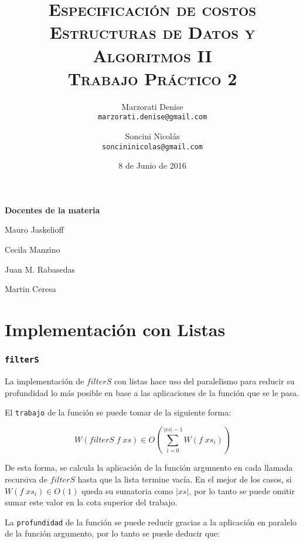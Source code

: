 \documentclass[a4paper,10pt]{article}
\author{
    Marzorati Denise \\
    \texttt{marzorati.denise@gmail.com}
    \and Soncini Nicolás \\
    \texttt{soncininicolas@gmail.com}
}
\date{
    8 de Junio de 2016
}
\title{
    \Huge \textsc{Especificación de costos} \\
    \large \textsc{Estructuras de Datos y Algoritmos II} \\
    \textsc{Trabajo Práctico 2}
}
\begin{document}
\bigskip
\bigskip
\bigskip

\maketitle

\thispagestyle{empty}

\begin{center}
\large \bf Docentes de la materia
\end{center}

\begin{center}
Mauro Jaskelioff

Cecila Manzino

Juan M. Rabasedas

Martin Ceresa
\end{center}

\newpage{}


\part*{Implementación con Listas}


\section*{\texttt{filterS}}

    La implementación de $filterS$ con listas hace uso del paralelismo para
reducir su profundidad lo más posible en base a las aplicaciones de la función 
que se le pasa.

    El \texttt{trabajo} de la función se puede tomar de la siguiente forma:

\begin{equation*}
    W \left(filterS\; f \;xs\right) \in
    O \left( \sum_{i=0}^{\vert xs \vert -1} W \left( f\; xs_i \right) \right)
\end{equation*}

De esta forma, se calcula la aplicación de la función argumento en cada
llamada recursiva de $filterS$ hasta que la lista termine vacía.
En el mejor de los casos, si $W \left( f\; xs_i \right) \in O \left( 1 \right)$ queda
su sumatoria como $\vert xs \vert$, por lo tanto se puede omitir sumar este valor
en la cota superior del trabajo.

\bigskip

La \texttt{profundidad} de la función se puede reducir gracias a la aplicación
en paralelo de la función argumento, por lo tanto se puede deducir que:
\end{document}
